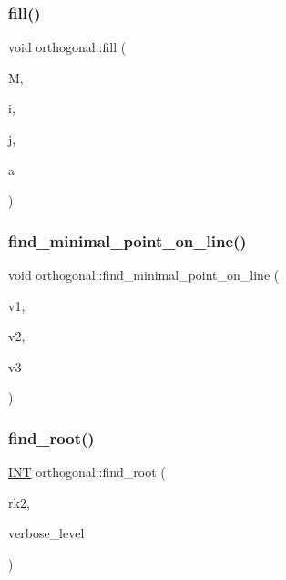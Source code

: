\subsubsection{\texorpdfstring{fill()}{fill()}}
{\footnotesize\ttfamily void orthogonal\+::fill (\begin{DoxyParamCaption}\item[{\mbox{\hyperlink{galois_8h_a09fddde158a3a20bd2dcadb609de11dc}{I\+NT}} $\ast$}]{M,  }\item[{\mbox{\hyperlink{galois_8h_a09fddde158a3a20bd2dcadb609de11dc}{I\+NT}}}]{i,  }\item[{\mbox{\hyperlink{galois_8h_a09fddde158a3a20bd2dcadb609de11dc}{I\+NT}}}]{j,  }\item[{\mbox{\hyperlink{galois_8h_a09fddde158a3a20bd2dcadb609de11dc}{I\+NT}}}]{a }\end{DoxyParamCaption})}

\mbox{\label{classorthogonal_a352d503273829a46f432965027a2d3ed}} 
\subsubsection{\texorpdfstring{find\+\_\+minimal\+\_\+point\+\_\+on\+\_\+line()}{find\_minimal\_point\_on\_line()}}
{\footnotesize\ttfamily void orthogonal\+::find\+\_\+minimal\+\_\+point\+\_\+on\+\_\+line (\begin{DoxyParamCaption}\item[{\mbox{\hyperlink{galois_8h_a09fddde158a3a20bd2dcadb609de11dc}{I\+NT}} $\ast$}]{v1,  }\item[{\mbox{\hyperlink{galois_8h_a09fddde158a3a20bd2dcadb609de11dc}{I\+NT}} $\ast$}]{v2,  }\item[{\mbox{\hyperlink{galois_8h_a09fddde158a3a20bd2dcadb609de11dc}{I\+NT}} $\ast$}]{v3 }\end{DoxyParamCaption})}

\mbox{\label{classorthogonal_a7cad6e763a1f49ab5e372a26f5cdf247}} 
\subsubsection{\texorpdfstring{find\+\_\+root()}{find\_root()}}
{\footnotesize\ttfamily \mbox{\hyperlink{galois_8h_a09fddde158a3a20bd2dcadb609de11dc}{I\+NT}} orthogonal\+::find\+\_\+root (\begin{DoxyParamCaption}\item[{\mbox{\hyperlink{galois_8h_a09fddde158a3a20bd2dcadb609de11dc}{I\+NT}}}]{rk2,  }\item[{\mbox{\hyperlink{galois_8h_a09fddde158a3a20bd2dcadb609de11dc}{I\+NT}}}]{verbose\+\_\+level }\end{DoxyParamCaption})}


